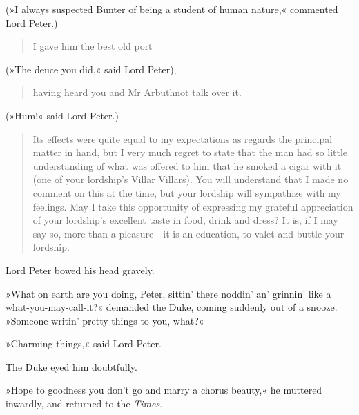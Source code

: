(»I always suspected Bunter of being a student of human nature,« commented Lord Peter.)

\begin{quotation}
I gave him the best old port 
\end{quotation}

(»The deuce you did,« said Lord Peter), 

\begin{quotation}
having heard you and Mr Arbuthnot talk over it.
\end{quotation}

 (»Hum!« said Lord Peter.)

\begin{quotation}
Its effects were quite equal to my expectations as regards the principal matter in hand, but I very much regret to state that the man had so little understanding of what was offered to him that he smoked a cigar with it (one of your lordship's Villar Villars). You will understand that I made no comment on this at the time, but your lordship will sympathize with my feelings. May I take this opportunity of expressing my grateful appreciation of your lordship's excellent taste in food, drink and dress? It is, if I may say so, more than a pleasure\allowbreak---\allowbreak it is an education, to valet and buttle your lordship.
\end{quotation}

Lord Peter bowed his head gravely.

»What on earth are you doing, Peter, sittin' there noddin' an' grinnin' like a what-you-may-call-it?« demanded the Duke, coming suddenly out of a snooze. »Someone writin' pretty things to you, what?«

»Charming things,« said Lord Peter.

The Duke eyed him doubtfully.

»Hope to goodness you don't go and marry a chorus beauty,« he muttered inwardly, and returned to the \textit{Times}.

